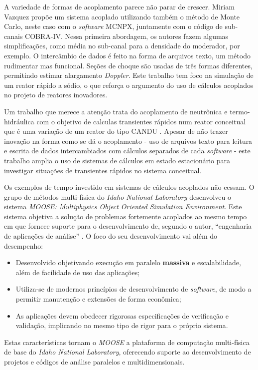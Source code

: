 A variedade de formas de acoplamento parece não parar de crescer. Miriam Vazquez
\cite{Vazquez2012} propõe
um sistema acoplado utilizando também o método de Monte Carlo, neste caso com o
\textit{software} MCNPX, juntamente com o código de sub-canais COBRA-IV. Nessa primeira
abordagem, os autores fazem algumas simplificações, como média no sub-canal para a
densidade do moderador, por exemplo. O intercâmbio de dados é feito na forma de arquivos
texto, um método rudimentar mas funcional. Seções de choque são usadas de três formas
diferentes, permitindo estimar alargamento \textit{Doppler}. Este trabalho tem foco na simulação
de um reator rápido a sódio, o que reforça o argumento do uso de cálculos acoplados no projeto
de reatores inovadores.

Um trabalho que merece a atenção trata do acoplamento de neutrônica e termo-hidráulica com o objetivo
de calculas transientes rápidos num reator conceitual que é uma variação de um reator do tipo CANDU
\cite{Hummel2016}. Apesar de não trazer inovação na forma como se dá o acoplamento - uso de arquivos
texto para leitura e escrita de dados intercambiados com cálculos separados de cada \textit{software} -
este trabalho amplia o uso de sistemas de cálculos em estado estacionário para investigar situações
de transientes rápidos no sistema conceitual.



Os exemplos de tempo investido em sistemas de cálculos acoplados não cessam. O grupo
de métodos multi-física do \textit{Idaho National Laboratory} desenvolveu o sistema
\textit{MOOSE: Multiphysics Object Oriented Simulation Environment}. Este sistema objetiva
a solução de problemas fortemente acoplados ao mesmo tempo em que fornece suporte para
o desenvolvimento de, segundo o autor, ``engenharia de aplicações de análise''
\cite{Gaston2009}. O foco do seu desenvolvimento vai além do desempenho:
\begin{itemize}
\item Desenvolvido objetivando execução em paralelo \textbf{massiva} e escalabilidade,
  além de facilidade de uso das aplicações;
\item Utiliza-se de modernos princípios de desenvolvimento de \textit{software}, de modo
  a permitir manutenção e extensões de forma econômica;
\item As aplicações devem obedecer rigorosas especificações de verificação e validação,
  implicando no mesmo tipo de rigor para o próprio sistema.
\end{itemize}
Estas características tornam o \textit{MOOSE} a plataforma de computação multi-física
de base do \textit{Idaho National Laboratory}, oferecendo suporte ao desenvolvimento
de projetos e códigos de análise paralelos e multidimensionais.


